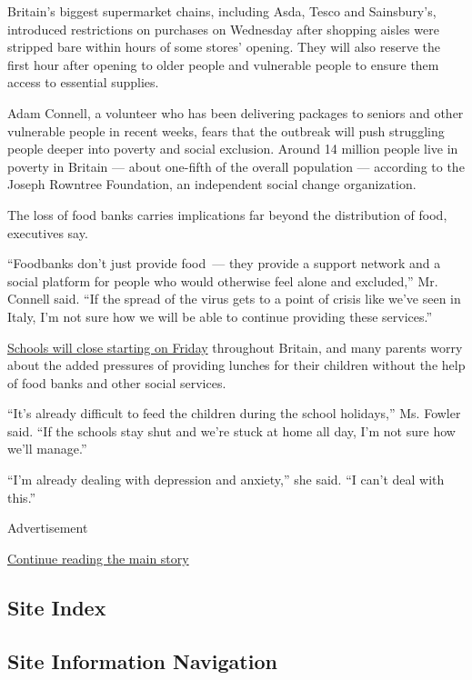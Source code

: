 Britain's biggest supermarket chains, including Asda, Tesco and
Sainsbury's, introduced restrictions on purchases on Wednesday after
shopping aisles were stripped bare within hours of some stores' opening.
They will also reserve the first hour after opening to older people and
vulnerable people to ensure them access to essential supplies.

Adam Connell, a volunteer who has been delivering packages to seniors
and other vulnerable people in recent weeks, fears that the outbreak
will push struggling people deeper into poverty and social exclusion.
Around 14 million people live in poverty in Britain --- about one-fifth
of the overall population --- according to the Joseph Rowntree
Foundation, an independent social change organization.

The loss of food banks carries implications far beyond the distribution
of food, executives say.

``Foodbanks don't just provide food~--- they provide a support network
and a social platform for people who would otherwise feel alone and
excluded,'' Mr. Connell said. ``If the spread of the virus gets to a
point of crisis like we've seen in Italy, I'm not sure how we will be
able to continue providing these services.''

\href{https://www.nytimes3xbfgragh.onion/2020/03/17/world/europe/EU-closes-borders-virus.html}{Schools
will close starting on Friday} throughout Britain, and many parents
worry about the added pressures of providing lunches for their children
without the help of food banks and other social services.

``It's already difficult to feed the children during the school
holidays,'' Ms. Fowler said. ``If the schools stay shut and we're stuck
at home all day, I'm not sure how we'll manage.''

``I'm already dealing with depression and anxiety,'' she said. ``I can't
deal with this.''

Advertisement

\protect\hyperlink{after-bottom}{Continue reading the main story}

\hypertarget{site-index}{%
\subsection{Site Index}\label{site-index}}

\hypertarget{site-information-navigation}{%
\subsection{Site Information
Navigation}\label{site-information-navigation}}

